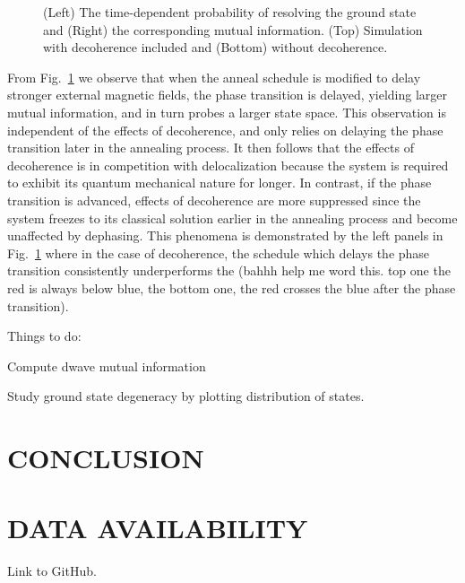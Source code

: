 \documentclass[prd,twocolumn,tightenlines,preprintnumbers,showpacs,superscriptaddress,notitlepage,nofootinbib,eqsecnum,floatfix,longbibliography]{revtex4}
\begin{document}
\begin{figure}
    \caption{(Left) The time-dependent probability of resolving the ground state and (Right) the corresponding mutual information.
(Top) Simulation with decoherence included and (Bottom) without decoherence.}
    \label{fig:prob_mi}
\end{figure}

From Fig.~\ref{fig:prob_mi} we observe that when the anneal schedule is modified to delay stronger external magnetic fields, the phase transition is delayed, yielding larger mutual information, and in turn probes a larger state space.
This observation is independent of the effects of decoherence, and only relies on delaying the phase transition later in the annealing process.
It then follows that the effects of decoherence is in competition with delocalization because the system is required to exhibit its quantum mechanical nature for longer.
In contrast, if the phase transition is advanced, effects of decoherence are more suppressed since the system freezes to its classical solution earlier in the annealing process and {\color{blue}become unaffected by dephasing.} This phenomena is demonstrated by the left panels in Fig.~\ref{fig:prob_mi} where in the case of decoherence, the schedule which delays the phase transition consistently underperforms the (bahhh help me word this.
top one the red is always below blue, the bottom one, the red crosses the blue after the phase transition).

Things to do:

Compute dwave mutual information

Study ground state degeneracy by plotting distribution of states.

\section{CONCLUSION}
\label{sec:conclusion}


\section{DATA AVAILABILITY}
\label{sec:open-source}

Link to GitHub.
\end{document}
